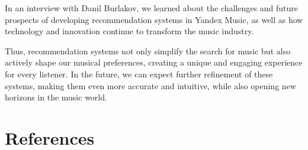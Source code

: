 \documentclass[12pt,a4paper]{article}
\begin{document}
In an interview with Danil Burlakov, we learned about the challenges and future prospects of developing recommendation systems in Yandex Music, as well as how technology and innovation continue to transform the music industry.

Thus, recommendation systems not only simplify the search for music but also actively shape our musical preferences, creating a unique and engaging experience for every listener. In the future, we can expect further refinement of these systems, making them even more accurate and intuitive, while also opening new horizons in the music world.

\sloppy
\newpage
\section{References}



\end{document}
